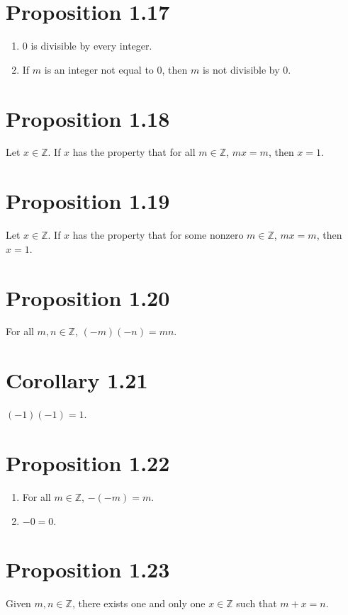 \section*{Proposition 1.17}
\begin{enumerate}[label=(\roman*)]
    \item $0$ is divisible by every integer.
    \item If $m$ is an integer not equal to $0$, then $m$ is not divisible by $0$.
\end{enumerate}

\section*{Proposition 1.18}
Let $x \in \mathbb{Z}$. If $x$ has the property that for all $m \in \mathbb{Z}$, $mx = m$, then $x=1$.

\section*{Proposition 1.19}
Let $x \in \mathbb{Z}$. If $x$ has the property that for some nonzero $m \in \mathbb{Z}$, $mx = m$, then $x = 1$.

\section*{Proposition 1.20}
For all $m, n \in \mathbb{Z}$, $(-m)(-n) = mn$.

\section*{Corollary 1.21}
$(-1)(-1) = 1$.

\section*{Proposition 1.22}
\begin{enumerate}[label=(\roman*)]
    \item For all $m \in \mathbb{Z}$, $-(−m) = m$.
    \item $-0 = 0$.
\end{enumerate}

\section*{Proposition 1.23}
Given $m, n \in \mathbb{Z}$, there exists one and only one $x \in \mathbb{Z}$ such that $m+x = n$.

